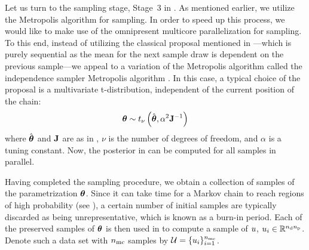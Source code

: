 Let us turn to the sampling stage, Stage~3 in . As mentioned earlier, we utilize the Metropolis algorithm for sampling. In order to speed up this process, we would like to make use of the omnipresent multicore parallelization for sampling. To this end, instead of utilizing the classical proposal mentioned in ---which is purely sequential as the mean for the next sample draw is dependent on the previous sample---we appeal to a variation of the Metropolis algorithm called the independence sampler Metropolis algorithm \cite{gelman2004}. In this case, a typical choice of the proposal is a multivariate t-distribution, independent of the current position of the chain:
\begin{equation} \elabel{proposal}
  \vparam \sim \studentst{\nu}{\hat{\vparam}}{\alpha^2 \mOI^{-1}}
\end{equation}
where $\hat{{\boldsymbol\theta}}$ and $\mathbf{J}$ are as in , $\nu$ is the number of degrees of freedom, and $\alpha$ is a tuning constant. Now, the posterior in  can be computed for all samples in parallel.

Having completed the sampling procedure, we obtain a collection of samples of the parametrization ${\boldsymbol\theta}$. Since it can take time for a Markov chain to reach regions of high probability (see ), a certain number of initial samples are typically discarded as being unrepresentative, which is known as a burn-in period.
Each of the preserved samples of ${\boldsymbol\theta}$ is then used in  to compute a sample of $u$, $u_i \in \mathbb{R}^{{n_\text{d}} {n_\text{p}}}$.
Denote such a data set with ${n_\text{mc}}$ samples by $\mathcal{U} = \{ u_i \}_{i = 1}^{n_\text{mc}}$.
